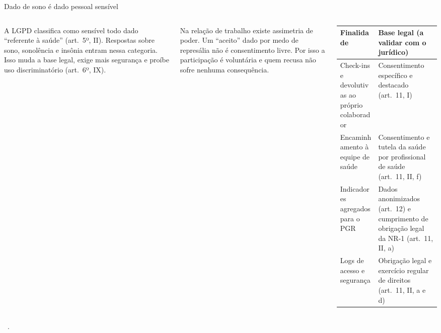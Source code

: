 \documentclass[aspectratio=169,10pt]{beamer}
\newcommand{\fonte}[1]{\par\vfill{\tiny\color{mudo}\faBookOpen\ #1\par}}
\begin{document}
\begin{frame}{Dado de sono é dado pessoal sensível}
\begin{columns}[T,onlytextwidth]
\small
A LGPD classifica como sensível todo dado \enquote{referente à saúde}
(art.\ 5º, II). Respostas sobre sono, sonolência e insônia entram nessa
categoria. Isso muda a base legal, exige mais segurança e proíbe uso
discriminatório (art.\ 6º, IX).

\medskip
Na relação de trabalho existe assimetria de poder. Um \enquote{aceito}
dado por medo de represália não é consentimento livre. Por isso a
participação é voluntária e quem recusa não sofre nenhuma consequência.
\scriptsize
\begin{tabularx}{\linewidth}{@{}L L@{}}
\toprule
\textbf{Finalidade} & \textbf{Base legal (a validar com o jurídico)} \\
\midrule
Check-ins e devolutivas ao próprio colaborador & Consentimento específico e destacado (art.\ 11, I) \\
Encaminhamento à equipe de saúde & Consentimento e tutela da saúde por profissional de saúde (art.\ 11, II, f) \\
Indicadores agregados para o PGR & Dados anonimizados (art.\ 12) e cumprimento de obrigação legal da NR-1 (art.\ 11, II, a) \\
Logs de acesso e segurança & Obrigação legal e exercício regular de direitos (art.\ 11, II, a e d) \\
\bottomrule
\end{tabularx}
\end{columns}
\fonte{\textcite{lgpd2018}.}
\end{frame}
\end{document}
